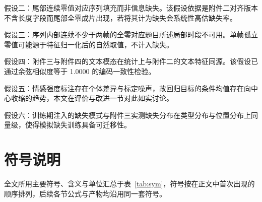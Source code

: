 \documentclass[withoutpreface,bwprint]{cumcmthesis}
\begin{document}
假设二：尾部连续零值对应序列填充而非信息缺失。该假设依据是附件二对齐版本不含长度字段而尾部全零成片出现，若将其计为缺失会系统性高估缺失率。

假设三：序列内部连续不少于两帧的全零对应题目所述局部时段不可用。单帧孤立零值可能源于特征归一化后的自然取值，不计入缺失。

假设四：附件三与附件四的文本模态在统计上与附件二的文本特征同源。该假设已通过余弦相似度等于 1.0000 的编码一致性检验。

假设五：情感强度标注存在个体差异与标定噪声，故回归目标的条件均值存在向中心收缩的趋势，本文在评价与改进一节对此如实讨论。

假设六：训练期注入的缺失模式与附件三实测缺失分布在类型分布与位置分布上同量级，使得模拟缺失训练具备可迁移性。

\section{符号说明}

全文所用主要符号、含义与单位汇总于表~\ref{tab:sym}，符号按在正文中首次出现的顺序排列，后续各节公式与产物均沿用同一套符号。
\end{document}
